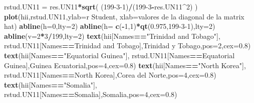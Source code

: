 \documentclass[
]{article}
\newenvironment{Shaded}{\begin{snugshade}}{\end{snugshade}}
\newcommand{\AttributeTok}[1]{\textcolor[rgb]{0.13,0.29,0.53}{#1}}
\newcommand{\DecValTok}[1]{\textcolor[rgb]{0.00,0.00,0.81}{#1}}
\newcommand{\FloatTok}[1]{\textcolor[rgb]{0.00,0.00,0.81}{#1}}
\newcommand{\FunctionTok}[1]{\textcolor[rgb]{0.13,0.29,0.53}{\textbf{#1}}}
\newcommand{\NormalTok}[1]{#1}
\newcommand{\OtherTok}[1]{\textcolor[rgb]{0.56,0.35,0.01}{#1}}
\newcommand{\SpecialCharTok}[1]{\textcolor[rgb]{0.81,0.36,0.00}{\textbf{#1}}}
\newcommand{\StringTok}[1]{\textcolor[rgb]{0.31,0.60,0.02}{#1}}
\begin{document}
\begin{Shaded}
\begin{Highlighting}[]
\NormalTok{rstud.UN11 }\OtherTok{=}\NormalTok{ res.UN11}\SpecialCharTok{*}\FunctionTok{sqrt}\NormalTok{( (}\DecValTok{199{-}3{-}1}\NormalTok{)}\SpecialCharTok{/}\NormalTok{(}\DecValTok{199{-}3}\SpecialCharTok{{-}}\NormalTok{res.UN11}\SpecialCharTok{\^{}}\DecValTok{2}\NormalTok{) )}
\FunctionTok{plot}\NormalTok{(hii,rstud.UN11,}\AttributeTok{ylab=}\StringTok{\textquotesingle{}r Student\textquotesingle{}}\NormalTok{,}
     \AttributeTok{xlab=}\StringTok{\textquotesingle{}valores de la diagonal de la matrix hat\textquotesingle{}}\NormalTok{)}
\FunctionTok{abline}\NormalTok{(}\AttributeTok{h=}\DecValTok{0}\NormalTok{,}\AttributeTok{lty=}\DecValTok{2}\NormalTok{)}
\FunctionTok{abline}\NormalTok{(}\AttributeTok{h=} \FunctionTok{c}\NormalTok{(}\SpecialCharTok{{-}}\DecValTok{1}\NormalTok{,}\DecValTok{1}\NormalTok{)}\SpecialCharTok{*}\FunctionTok{qt}\NormalTok{(}\FloatTok{0.975}\NormalTok{,}\DecValTok{199{-}3{-}1}\NormalTok{),}\AttributeTok{lty=}\DecValTok{2}\NormalTok{)}
\FunctionTok{abline}\NormalTok{(}\AttributeTok{v=}\DecValTok{2}\SpecialCharTok{*}\DecValTok{3}\SpecialCharTok{/}\DecValTok{199}\NormalTok{,}\AttributeTok{lty=}\DecValTok{2}\NormalTok{)}
\FunctionTok{text}\NormalTok{(hii[Names}\SpecialCharTok{==}\StringTok{"Trinidad and Tobago"}\NormalTok{],}
\NormalTok{     rstud.UN11[Names}\SpecialCharTok{==}\StringTok{\textquotesingle{}Trinidad and Tobago\textquotesingle{}}\NormalTok{],}\StringTok{\textquotesingle{}Trinidad y Tobago\textquotesingle{}}\NormalTok{,}\AttributeTok{pos=}\DecValTok{2}\NormalTok{,}\AttributeTok{cex=}\FloatTok{0.8}\NormalTok{)}
\FunctionTok{text}\NormalTok{(hii[Names}\SpecialCharTok{==}\StringTok{"Equatorial Guinea"}\NormalTok{],}
\NormalTok{     rstud.UN11[Names}\SpecialCharTok{==}\StringTok{\textquotesingle{}Equatorial Guinea\textquotesingle{}}\NormalTok{],}\StringTok{\textquotesingle{}Guinea Ecuatorial\textquotesingle{}}\NormalTok{,}\AttributeTok{pos=}\DecValTok{4}\NormalTok{,}\AttributeTok{cex=}\FloatTok{0.8}\NormalTok{)}
\FunctionTok{text}\NormalTok{(hii[Names}\SpecialCharTok{==}\StringTok{"North Korea"}\NormalTok{],}
\NormalTok{     rstud.UN11[Names}\SpecialCharTok{==}\StringTok{\textquotesingle{}North Korea\textquotesingle{}}\NormalTok{],}\StringTok{\textquotesingle{}Corea del Norte\textquotesingle{}}\NormalTok{,}\AttributeTok{pos=}\DecValTok{4}\NormalTok{,}\AttributeTok{cex=}\FloatTok{0.8}\NormalTok{)}
\FunctionTok{text}\NormalTok{(hii[Names}\SpecialCharTok{==}\StringTok{"Somalia"}\NormalTok{],}
\NormalTok{     rstud.UN11[Names}\SpecialCharTok{==}\StringTok{\textquotesingle{}Somalia\textquotesingle{}}\NormalTok{],}\StringTok{\textquotesingle{}Somalia\textquotesingle{}}\NormalTok{,}\AttributeTok{pos=}\DecValTok{4}\NormalTok{,}\AttributeTok{cex=}\FloatTok{0.8}\NormalTok{)}

\end{Highlighting}
\end{Shaded}
\end{document}
